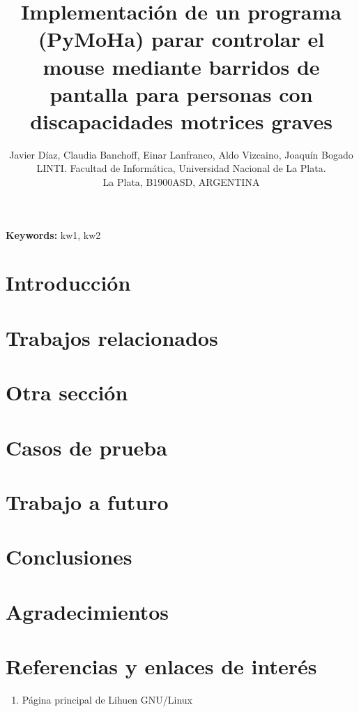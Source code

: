 \documentclass[final,narroweqnarray,inline,twoside]{ieee}
\author{Javier Díaz, Claudia Banchoff, Einar Lanfranco, Aldo Vizcaino, Joaquín Bogado
\\LINTI. Facultad de Informática, Universidad Nacional de La Plata.
\\La Plata, B1900ASD, ARGENTINA
}
\title{Implementación de un programa (PyMoHa) parar controlar el mouse mediante barridos de pantalla para personas con discapacidades motrices graves}
\begin{document}
\maketitle
\sloppy

\begin{abstract}

\end{abstract}

\noindent \textbf{Keywords: } kw1, kw2

\section{Introducción}

\section{Trabajos relacionados}

\section{Otra sección}

\section{Casos de prueba}

\section{Trabajo a futuro}

\section{Conclusiones}

\section{Agradecimientos}

\section{Referencias y enlaces de interés}

\begin{enumerate}
\item Página principal de Lihuen GNU/Linux\\
\\[Visitado el día 9 de enero de 2009]
\end{enumerate}
\end{document}
